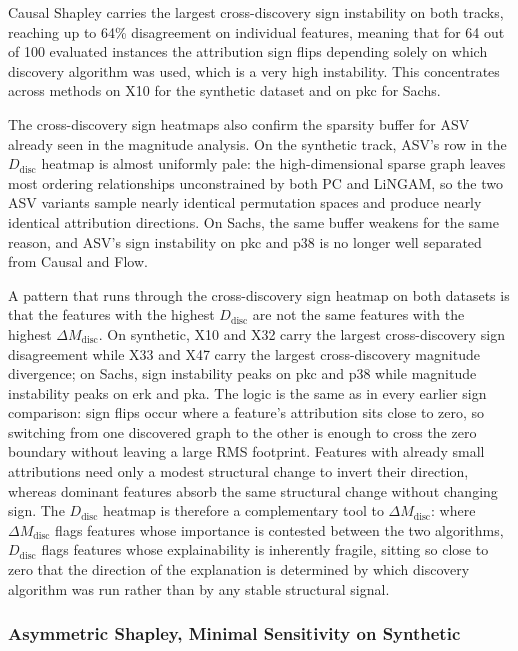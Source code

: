 \documentclass[12pt,a4paper,oneside]{article}
\begin{document}
Causal Shapley carries the largest cross-discovery sign instability on both tracks, reaching up to 64\% disagreement on individual features, meaning that for 64 out of 100 evaluated instances the attribution sign flips depending solely on which discovery algorithm was used, which is a very high instability. This concentrates across methods on X10 for the synthetic dataset and on pkc for Sachs.

The cross-discovery sign heatmaps also confirm the sparsity buffer for ASV already seen in the magnitude analysis. On the synthetic track, ASV's row in the $D_{\text{disc}}$ heatmap is almost uniformly pale: the high-dimensional sparse graph leaves most ordering relationships unconstrained by both PC and LiNGAM, so the two ASV variants sample nearly identical permutation spaces and produce nearly identical attribution directions. On Sachs, the same buffer weakens for the same reason, and ASV's sign instability on pkc and p38 is no longer well separated from Causal and Flow.

A pattern that runs through the cross-discovery sign heatmap on both datasets is that the features with the highest $D_{\text{disc}}$ are not the same features with the highest $\Delta M_{\text{disc}}$. On synthetic, X10 and X32 carry the largest cross-discovery sign disagreement while X33 and X47 carry the largest cross-discovery magnitude divergence; on Sachs, sign instability peaks on pkc and p38 while magnitude instability peaks on erk and pka. The logic is the same as in every earlier sign comparison: sign flips occur where a feature's attribution sits close to zero, so switching from one discovered graph to the other is enough to cross the zero boundary without leaving a large RMS footprint. Features with already small attributions need only a modest structural change to invert their direction, whereas dominant features absorb the same structural change without changing sign. The $D_{\text{disc}}$ heatmap is therefore a complementary tool to $\Delta M_{\text{disc}}$: where $\Delta M_{\text{disc}}$ flags features whose importance is contested between the two algorithms, $D_{\text{disc}}$ flags features whose explainability is inherently fragile, sitting so close to zero that the direction of the explanation is determined by which discovery algorithm was run rather than by any stable structural signal.

\subsubsection{Asymmetric Shapley, Minimal Sensitivity on Synthetic}
\end{document}
